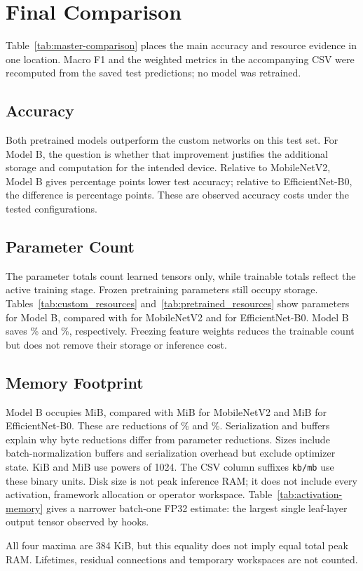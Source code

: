 \section{Final Comparison}
\label{sec:comparison}
Table~\ref{tab:master-comparison} places the main accuracy and resource evidence
in one location. Macro F1 and the weighted metrics in the accompanying CSV were
recomputed from the saved test predictions; no model was retrained.

\subsection{Accuracy}
Both pretrained models outperform the custom networks on this test set. For
Model B, the question is whether that improvement justifies the additional
storage and computation for the intended device.
Relative to MobileNetV2, Model B gives \MobileAccuracyGap{} percentage points
lower test accuracy; relative to EfficientNet-B0, the difference is
\EfficientAccuracyGap{} percentage points. These are observed accuracy costs
under the tested configurations.
\subsection{Parameter Count}
The parameter totals count learned tensors only, while trainable totals reflect
the active training stage. Frozen pretraining parameters still occupy storage.
Tables~\ref{tab:custom_resources} and~\ref{tab:pretrained_resources} show
\BParams{} parameters for Model B, compared with \MobileParams{} for
MobileNetV2 and \EfficientParams{} for EfficientNet-B0. Model B saves
\MobileParamSaving\% and \EfficientParamSaving\%, respectively. Freezing
feature weights reduces the trainable count but does not remove their storage
or inference cost.
\subsection{Memory Footprint}
Model B occupies \BSizeMiB{} MiB, compared with \MobileSizeMiB{} MiB
for MobileNetV2 and \EfficientSizeMiB{} MiB for EfficientNet-B0. These are
reductions of \MobileStorageSaving\% and \EfficientStorageSaving\%.
Serialization and buffers explain why byte reductions differ from parameter
reductions.
Sizes include batch-normalization buffers and serialization overhead but exclude
optimizer state. KiB and MiB use powers of 1024. The CSV column suffixes
\texttt{kb/mb} use these binary units. Disk size is not peak inference RAM;
it does not include every activation, framework allocation or operator
workspace. Table~\ref{tab:activation-memory} gives a narrower batch-one FP32
estimate: the largest single leaf-layer output tensor observed by hooks.

All four maxima are 384 KiB, but this equality does not imply equal total peak
RAM. Lifetimes, residual connections and temporary workspaces are not counted.
